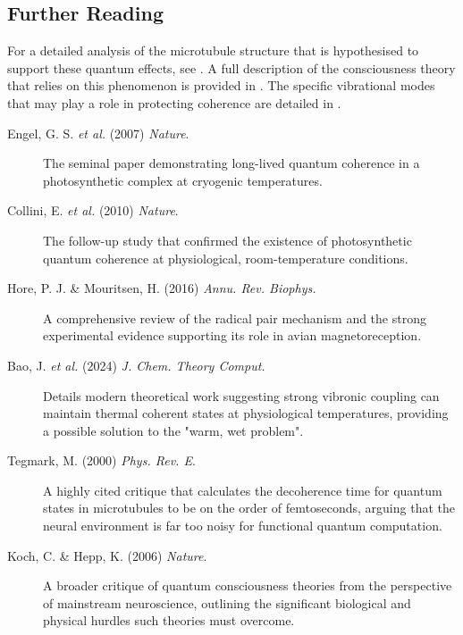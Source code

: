 \begin{importantbox}
\section*{Further Reading}
For a detailed analysis of the microtubule structure that is hypothesised to support these quantum effects, see . A full description of the consciousness theory that relies on this phenomenon is provided in . The specific vibrational modes that may play a role in protecting coherence are detailed in .
\begin{description}
\item[Engel, G. S. \textit{et al.} (2007) \textit{Nature}.] The seminal paper demonstrating long-lived quantum coherence in a photosynthetic complex at cryogenic temperatures.
\item[Collini, E. \textit{et al.} (2010) \textit{Nature}.] The follow-up study that confirmed the existence of photosynthetic quantum coherence at physiological, room-temperature conditions.
\item[Hore, P. J. & Mouritsen, H. (2016) \textit{Annu. Rev. Biophys.}] A comprehensive review of the radical pair mechanism and the strong experimental evidence supporting its role in avian magnetoreception.
\item[Bao, J. \textit{et al.} (2024) \textit{J. Chem. Theory Comput.}] Details modern theoretical work suggesting strong vibronic coupling can maintain thermal coherent states at physiological temperatures, providing a possible solution to the "warm, wet problem".
\end{description}
\begin{description}
\item[Tegmark, M. (2000) \textit{Phys. Rev. E}.] A highly cited critique that calculates the decoherence time for quantum states in microtubules to be on the order of femtoseconds, arguing that the neural environment is far too noisy for functional quantum computation.
\item[Koch, C. & Hepp, K. (2006) \textit{Nature}.] A broader critique of quantum consciousness theories from the perspective of mainstream neuroscience, outlining the significant biological and physical hurdles such theories must overcome.
\end{description}
\end{importantbox}